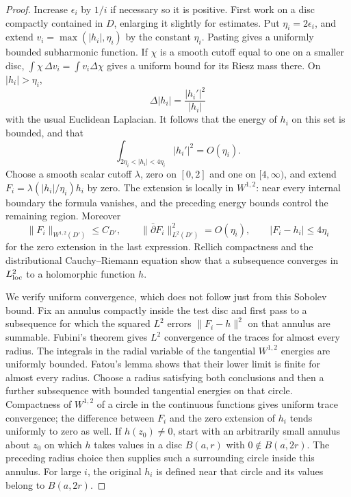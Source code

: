 \begin{proof}
Increase \(\epsilon_i\) by \(1/i\) if necessary so it is positive.
First work on a disc compactly contained in \(D\), enlarging it
slightly for estimates. Put \(\eta_i=2\epsilon_i\), and extend
\(v_i=\max(|h_i|,\eta_i)\) by the constant \(\eta_i\).
Pasting gives a uniformly bounded subharmonic function. If
\(\chi\) is a smooth cutoff equal to one on a smaller disc,
\(\int\chi\,\Delta v_i=\int v_i\Delta\chi\) gives a uniform
bound for its Riesz mass there. On \(|h_i|>\eta_i\),
\[
 \Delta|h_i|=\frac{|h_i'|^2}{|h_i|}
\]
with the usual Euclidean Laplacian. It follows that the energy
of \(h_i\) on this set is bounded, and that
\[
 \int_{2\eta_i<|h_i|<4\eta_i}|h_i'|^2=O(\eta_i).
\]
Choose a smooth scalar cutoff \(\lambda\), zero on \([0,2]\)
and one on \([4,\infty)\), and extend
\(F_i=\lambda(|h_i|/\eta_i)h_i\) by zero. The extension is
locally in \(W^{1,2}\): near every internal boundary the formula
vanishes, and the preceding energy bounds control the remaining
region. Moreover
\[
 \|F_i\|_{W^{1,2}(D')}\leq C_{D'},\qquad
 \|\bar\partial F_i\|_{L^2(D')}^2=O(\eta_i),\qquad
 |F_i-h_i|\leq4\eta_i
\]
for the zero extension in the last expression. Rellich compactness
and the distributional Cauchy--Riemann equation show that a
subsequence converges in \(L^2_{\rm loc}\) to a holomorphic
function \(h\).

We verify uniform convergence, which does not follow just from
this Sobolev bound. Fix an annulus compactly inside the test disc
and first pass to a subsequence for which the squared \(L^2\)
errors \(\|F_i-h\|^2\) on that annulus are summable. Fubini's
theorem gives \(L^2\) convergence of the traces for almost every
radius. The integrals in the radial variable of the tangential
\(W^{1,2}\) energies are uniformly bounded. Fatou's lemma shows
that their lower limit is finite for almost every radius. Choose
a radius satisfying both conclusions and then a further subsequence
with bounded tangential energies on that circle. Compactness of
\(W^{1,2}\) of a circle in the continuous functions gives uniform
trace convergence; the difference between \(F_i\) and the zero
extension of \(h_i\) tends uniformly to zero as well.
If \(h(z_0)\ne0\), start with an arbitrarily small annulus about
\(z_0\) on which \(h\) takes values in a disc \(B(a,r)\) with
\(0\notin\overline{B(a,2r)}\). The preceding radius choice then
supplies such a surrounding circle inside this annulus.
For large \(i\), the original \(h_i\) is defined near that
circle and its values belong to \(B(a,2r)\).


\end{proof}
